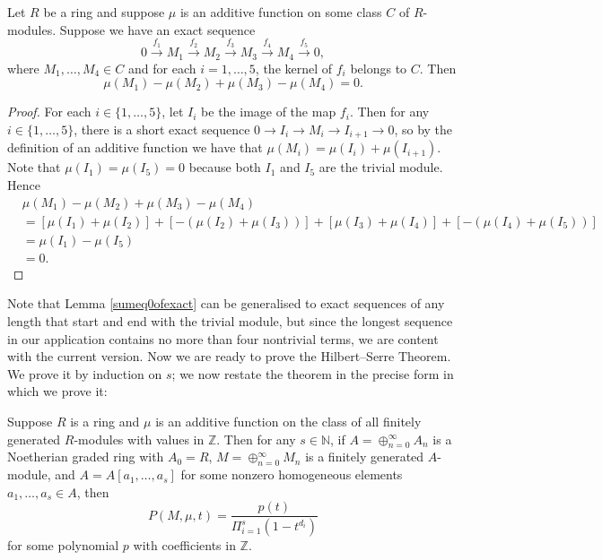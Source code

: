 \begin{lemma}
\label{sumeq0ofexact}
\leanok
Let $R$ be a ring and suppose $\mu$ is an additive function on some class $C$ of $R$-modules. Suppose we have an exact sequence
\begin{equation}
0\stackrel{f_1}{\rightarrow}M_1\stackrel{f_2}{\rightarrow}M_2\stackrel{f_3}{\rightarrow}{M_3}\stackrel{f_4}{\rightarrow}{M_4}\stackrel{f_5}{\rightarrow}0,
\end{equation}
where $M_1,\ldots,M_4\in{C}$ and for each $i=1,\ldots,5$, the kernel of $f_i$ belongs to $C$. Then
\begin{equation}
\mu(M_1)-\mu(M_2)+\mu(M_3)-\mu(M_4)=0.
\end{equation}
\end{lemma}
\begin{proof}
For each $i\in\{1,\ldots,5\}$, let $I_i$ be the image of the map $f_i$. Then for any $i\in\{1,\ldots,5\}$, there is a short exact sequence $0\rightarrow{I_i}\rightarrow{M_i}\rightarrow{I_{i+1}}\rightarrow{0}$, so by the definition of an additive function we have that $\mu(M_i)=\mu(I_i)+\mu(I_{i+1})$. Note that $\mu(I_1)=\mu(I_{5})=0$ because both $I_1$ and $I_{5}$ are the trivial module. Hence
\begin{equation}
\begin{split}
& \mu(M_1)-\mu(M_2)+\mu(M_3)-\mu(M_4)
\\
& = [\mu(I_1)+\mu(I_2)]+[-(\mu(I_2)+\mu(I_3))]+[\mu(I_3)+\mu(I_4)]+[-(\mu(I_4)+\mu(I_{5}))]
\\
& = \mu(I_1)-\mu(I_{5})
\\
& = 0.
\end{split}
\end{equation}
\end{proof}

Note that Lemma \ref{sumeq0ofexact} can be generalised to exact sequences of any length that start and end with the trivial module, but since the longest sequence in our application contains no more than four nontrivial terms, we are content with the current version. Now we are ready to prove the Hilbert--Serre Theorem. We prove it by induction on $s$; we now restate the theorem in the precise form in which we prove it:

\begin{theorem}
\label{HilSerInd}
Suppose $R$ is a ring and $\mu$ is an additive function on the class of all finitely generated $R$-modules with values in $\mathbb{Z}$. Then for any $s\in\mathbb{N}$, if $A=\oplus_{n=0}^{\infty}A_n$ is a Noetherian graded ring with $A_0=R$, $M=\oplus_{n=0}^{\infty}M_n$ is a finitely generated $A$-module, and $A=A[a_1,\ldots,a_s]$ for some nonzero homogeneous elements $a_1,\ldots,a_s\in{A}$, then
\begin{equation}
P(M,\mu,t)=\frac{p(t)}{\Pi_{i=1}^s(1-t^{d_i})}
\end{equation}
for some polynomial $p$ with coefficients in $\mathbb{Z}$.
\end{theorem}

